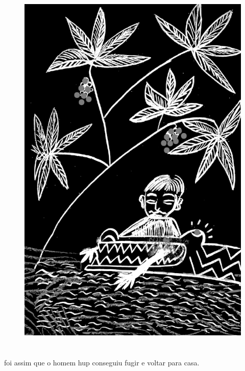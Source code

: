 \begin{figure}
\vspace*{-2cm}
\hspace*{-2.4cm}\includegraphics[width=142mm]{./imgs/img7.jpg}
\end{figure}

\chapter*{}

\mbox{}\vspace*{\fill}

 foi assim que
o homem hup
conseguiu fugir e
voltar para casa.

\medskip

